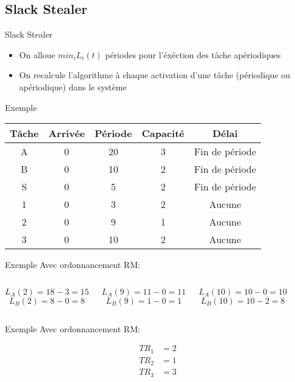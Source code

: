 \subsection{Slack Stealer}

\begin{frame}{Slack Stealer}
  \begin{itemize} 
  \item On  alloue $min_i L_i(t)$  périodes pour l'éxéction  des tâche
    apériodiques
  \item  On recalcule  l'algorithme  à chaque  activation d'une  tâche
    (périodique ou apériodique) dans le système
  \end{itemize}
\end{frame} 

\begin{frame}{Exemple}
  \begin{center}
    \begin{tabular}{ccccc}
      \hline
      Tâche & Arrivée & Période & Capacité & Délai \\
      \hline
      A & 0 & 20 & 3 & Fin de période\\
      B & 0 & 10 & 2 & Fin de période\\
      S & 0 &  5 & 2 & Fin de période\\
      1 & 0 &  3 & 2 & Aucune\\
      2 & 0 &  9 & 1 & Aucune\\
      3 & 0 & 10 & 2 & Aucune\\
      \hline
    \end{tabular}
  \end{center}
\end{frame}

\begin{frame}{Exemple}
  Avec ordonnancement RM:
  \begin{center}
    
    \begin{columns}
      $$L_A(2) = 18 - 3 =  15$$
      $$L_B(2) = 8 - 0 =  8$$

      $$L_A(9) = 11 - 0 = 11$$
      $$L_B(9) = 1 - 0 = 1$$

      $$L_A(10) = 10 - 0 =  10$$
      $$L_B(10) = 10 - 2 =  8$$
    \end{columns}
  \end{center}
\end{frame} 

\begin{frame}{Exemple}
  Avec ordonnancement RM:
  \begin{center}
    
    \begin{align*}
      TR_1 &= 2\\
      TR_2 &= 1\\
      TR_3 &= 3\\
    \end{align*}
  \end{center}
\end{frame} 

